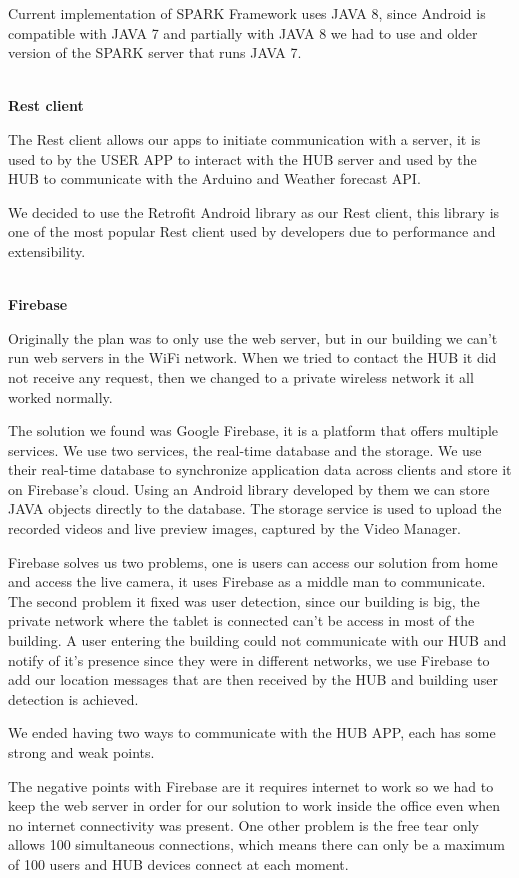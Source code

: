 Current implementation of SPARK Framework uses JAVA 8, since Android is compatible with JAVA 7 and partially with JAVA 8 we had to use and older version of the SPARK server that runs JAVA 7.  

\mbox{}\\
\textbf{Rest client}

The Rest client allows our apps to initiate communication with a server, it is used to by the USER APP to interact with the HUB server and used by the HUB to communicate with the Arduino and Weather forecast API.

We decided to use the Retrofit Android library as our Rest client, this library is one of the most popular Rest client used by developers due to performance and extensibility.



\mbox{}\\
\textbf{Firebase}

Originally the plan was to only use the web server, but in our building we can't run web servers in the WiFi network. When we tried to contact the HUB it did not receive any request, then we changed to a private wireless network it all worked normally.

The solution we found was Google Firebase, it is a platform that offers multiple services. We use two services, the real-time database and the storage.
We use their real-time database to synchronize application data across clients and store it on Firebase's cloud. Using an Android library developed by them we can store JAVA objects directly to the database. The storage service is used to upload the recorded videos and live preview images, captured by the Video Manager.

Firebase solves us two problems, one is users can access our solution from home and access the live camera, it uses Firebase as a middle man to communicate. The second problem it fixed was user detection, since our building is big, the private network where the tablet is connected can't be access in most of the building. A user entering the building could not communicate with our HUB and notify of it's presence since they were in different networks, we use Firebase to add our location messages that are then received by the HUB and building user detection is achieved.

We ended having two ways to communicate with the HUB APP, each has some strong and weak points. 

The negative points with Firebase are it requires internet to work so we had to keep the web server in order for our solution to work inside the office even when no internet connectivity was present. One other problem is the free tear only allows 100 simultaneous connections, which means there can only be a maximum of 100 users and HUB devices connect at each moment.

